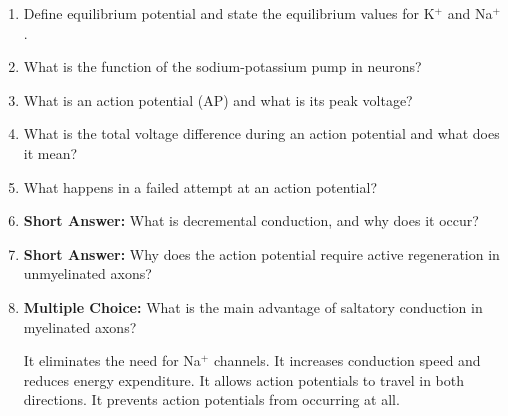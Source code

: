 \begin{enumerate}[label=\textbf{Q2.3.\arabic*}]
      \item Define equilibrium potential and state the equilibrium values for K\(^{+}\) and Na\(^{+}\). \\
      \item What is the function of the sodium-potassium pump in neurons? \\
      \item What is an action potential (AP) and what is its peak voltage? \\
      \item What is the total voltage difference during an action potential and what does it mean? \\
      \item What happens in a failed attempt at an action potential? \\

      \item \textbf{Short Answer:} What is decremental conduction, and why does it occur? \\

      \item \textbf{Short Answer:} Why does the action potential require active regeneration in unmyelinated axons? \\

      \item \textbf{Multiple Choice:} What is the main advantage of saltatory conduction in myelinated axons?
            \begin{tasks}
                  \task It eliminates the need for Na\(^+\) channels.
                  \task It increases conduction speed and reduces energy expenditure.
                  \task It allows action potentials to travel in both directions.
                  \task It prevents action potentials from occurring at all.
            \end{tasks}


\end{enumerate}
